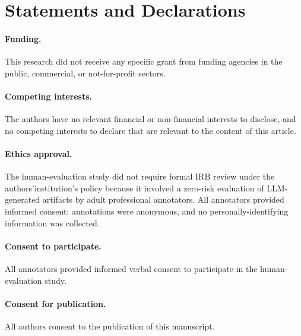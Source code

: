 \documentclass[smallextended]{svjour3}
\begin{document}
\section*{Statements and Declarations}

\paragraph{Funding.}
This research did not receive any specific grant from funding
agencies in the public, commercial, or not-for-profit sectors.

\paragraph{Competing interests.}
The authors have no relevant financial or non-financial interests to
disclose, and no competing interests to declare that are relevant to
the content of this article.

\paragraph{Ethics approval.}
The human-evaluation study did not require formal IRB review under
the authors'institution's policy because it involved a zero-risk
evaluation of LLM-generated artifacts by adult professional
annotators. All annotators provided informed consent; annotations
were anonymous, and no personally-identifying information was
collected.

\paragraph{Consent to participate.}
All annotators provided informed verbal consent to participate in
the human-evaluation study.

\paragraph{Consent for publication.}
All authors consent to the publication of this manuscript.
\end{document}
